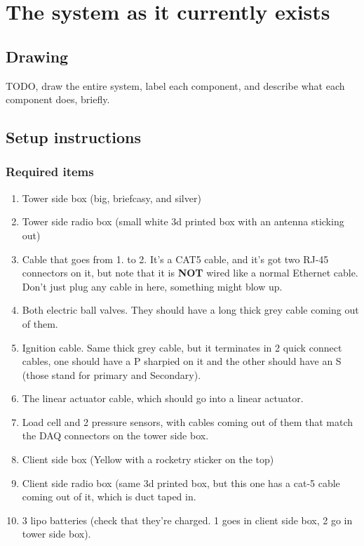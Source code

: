 \documentclass[11pt]{article}
\begin{document}
\section{The system as it currently exists}
\label{sec:org14d4550}

\subsection{Drawing}
\label{sec:org3057ff4}

TODO, draw the entire system, label each component, and describe what each
component does, briefly.

\subsection{Setup instructions}
\label{sec:org8f259bb}

\subsubsection{Required items}
\label{sec:orgf6e0c4c}
\begin{enumerate}
\item Tower side box (big, briefcasy, and silver)
\item Tower side radio box (small white 3d printed box with an antenna sticking
out)
\item Cable that goes from 1. to 2. It's a CAT5 cable, and it's got two RJ-45
connectors on it, but note that it is \textbf{NOT} wired like a normal Ethernet
cable. Don't just plug any cable in here, something might blow up.
\item Both electric ball valves. They should have a long thick grey cable coming
out of them.
\item Ignition cable. Same thick grey cable, but it terminates in 2 quick connect
cables, one should have a P sharpied on it and the other should have an S
(those stand for primary and Secondary).
\item The linear actuator cable, which should go into a linear actuator.
\item Load cell and 2 pressure sensors, with cables coming out of them that match
the DAQ connectors on the tower side box.
\item Client side box (Yellow with a rocketry sticker on the top)
\item Client side radio box (same 3d printed box, but this one has a cat-5 cable
coming out of it, which is duct taped in.
\item 3 lipo batteries (check that they're charged. 1 goes in client side box, 2 go
in tower side box).
\end{enumerate}
\end{document}
